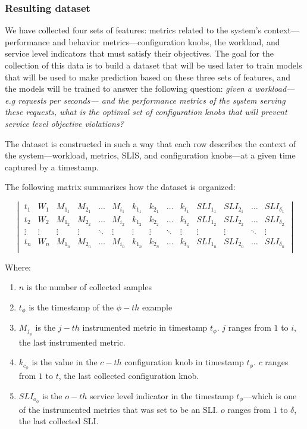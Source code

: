 

\subsubsection{Resulting dataset}

We have collected four sets of features: metrics related to the system's context---performance and behavior metrics---configuration knobs, the workload, and service level indicators that must satisfy their objectives. The goal for the collection of this data is to build a dataset that will be used later to train models that will be used to make prediction based on these three sets of features, and the models will be trained to answer the following question: \textit{given a workload---e.g requests per seconds--- and the performance metrics of the system serving these requests, what is the optimal set of configuration knobs that will prevent service level objective violations?}

The dataset is constructed in such a way that each row describes the context of the system---workload, metrics, SLIS, and configuration knobs---at a given time captured by a timestamp.

The following matrix summarizes how the dataset is organized:

\setlength{\arraycolsep}{1pt}
\renewcommand\arraystretch{1.0}
\setcounter{MaxMatrixCols}{20}
$$
\begin{vmatrix}
  t_1 & W_1 & M_{1_1} & M_{2_1} & \dots & M_{i_1} & k_{1_1} & k_{2_1} & \dots & k_{t_1} & SLI_{1_1} & SLI_{2_1} & \dots & SLI_{\delta_1}\\
  t_2 & W_2 & M_{1_2} & M_{2_2} & \dots & M_{i_2} & k_{1_2} & k_{2_2} & \dots & k_{t_2} & SLI_{1_2} & SLI_{2_2} & \dots & SLI_{\delta_2}\\
  \vdots & \vdots & \vdots & \vdots & \ddots & \vdots & \vdots & \vdots & \ddots & \vdots & \vdots & \vdots & \ddots & \vdots \\
  t_n & W_n & M_{1_n} & M_{2_n} & \dots & M_{i_n} & k_{1_n} & k_{2_n} & \dots & k_{t_n} & SLI_{1_n} & SLI_{2_n} & \dots & SLI_{\delta_n}\\
\end{vmatrix}
$$

Where:

\begin{enumerate}
  \item $n$ is the number of collected samples
  \item $t_{\phi}$ is the timestamp of the $\phi-th$ example
  \item $M_{j_\phi}$ is the $j-th$ instrumented metric in timestamp $t_{\phi}$. $j$ ranges from $1$ to $i$, the last instrumented metric.
  \item $k_{c_\phi}$ is the value in the $c-th$ configuration knob in timestamp $t_{\phi}$. $c$ ranges from $1$ to $t$, the last collected configuration knob.
  \item $SLI_{o_\phi}$ is the $o-th$ service level indicator in the timestamp $t_{\phi}$---which is one of the instrumented metrics that was set to be an SLI. $o$ ranges from $1$ to $\delta$, the last collected SLI.
\end{enumerate}

